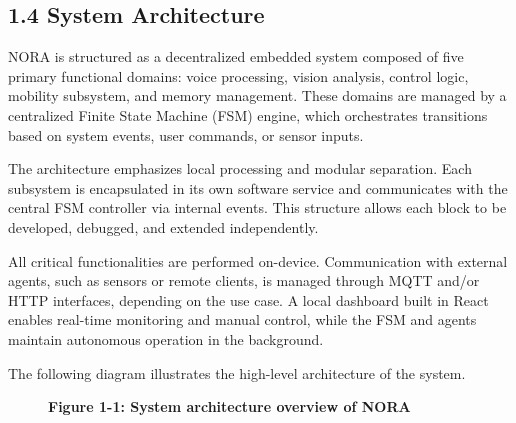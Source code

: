\subsection*{1.4 System Architecture}

NORA is structured as a decentralized embedded system composed of five primary functional domains: voice processing, vision analysis, control logic, mobility subsystem, and memory management. These domains are managed by a centralized Finite State Machine (FSM) engine, which orchestrates transitions based on system events, user commands, or sensor inputs.

The architecture emphasizes local processing and modular separation. Each subsystem is encapsulated in its own software service and communicates with the central FSM controller via internal events. This structure allows each block to be developed, debugged, and extended independently.

All critical functionalities are performed on-device. Communication with external agents, such as sensors or remote clients, is managed through MQTT and/or HTTP interfaces, depending on the use case. A local dashboard built in React enables real-time monitoring and manual control, while the FSM and agents maintain autonomous operation in the background.

\vspace{0.5cm}
The following diagram illustrates the high-level architecture of the system.

\vspace{0.5cm}

\begin{figure}[H]
\centering
{}
\caption*{\textbf{Figure 1-1: System architecture overview of NORA}}
\end{figure}
